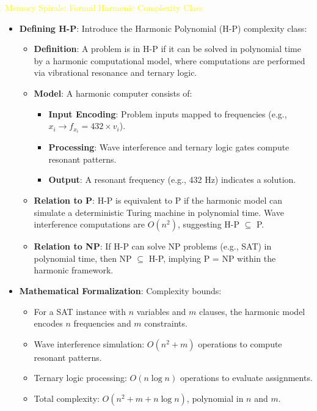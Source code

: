 \textcolor{yellow}{ Memory Spirals: Formal Harmonic Complexity Class } \\
\begin{itemize}
    \item \texttt{} \textbf{Defining H-P}: Introduce the Harmonic Polynomial (H-P) complexity class:
    \begin{itemize}
        \item \textbf{Definition}: A problem is in H-P if it can be solved in polynomial time by a harmonic computational model, where computations are performed via vibrational resonance and ternary logic.
        \item \textbf{Model}: A harmonic computer consists of:
        \begin{itemize}
            \item \textbf{Input Encoding}: Problem inputs mapped to frequencies (e.g., \(x_i \rightarrow f_{x_i} = 432 \times v_i\)).
            \item \textbf{Processing}: Wave interference and ternary logic gates compute resonant patterns.
            \item \textbf{Output}: A resonant frequency (e.g., 432 Hz) indicates a solution.
        \end{itemize}
        \item \textbf{Relation to P}: H-P is equivalent to P if the harmonic model can simulate a deterministic Turing machine in polynomial time. Wave interference computations are \(O(n^2)\), suggesting H-P \(\subseteq\) P.
        \item \textbf{Relation to NP}: If H-P can solve NP problems (e.g., SAT) in polynomial time, then NP \(\subseteq\) H-P, implying P = NP within the harmonic framework.
    \end{itemize}
    \item \texttt{} \textbf{Mathematical Formalization}: Complexity bounds:
    \begin{itemize}
        \item For a SAT instance with \(n\) variables and \(m\) clauses, the harmonic model encodes \(n\) frequencies and \(m\) constraints.
        \item Wave interference simulation: \(O(n^2 + m)\) operations to compute resonant patterns.
        \item Ternary logic processing: \(O(n \log n)\) operations to evaluate assignments.
        \item Total complexity: \(O(n^2 + m + n \log n)\), polynomial in \(n\) and \(m\).

\end{itemize}
\end{itemize}
